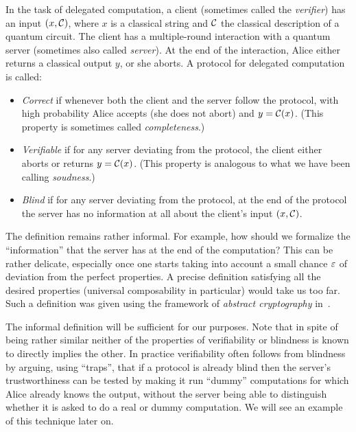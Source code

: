 \begin{definition}
In the task of delegated computation, a client (sometimes called the \emph{verifier}) has an input $(x,\mathcal{C})$, where $x$ is a classical string and $\mathcal{C}$ the classical description of a quantum circuit. The client has a multiple-round interaction with a quantum server (sometimes also called \emph{server}). At the end of the interaction, Alice either returns a classical output $y$, or she aborts. A protocol for delegated computation is called:
\begin{itemize}
\item \emph{Correct} if whenever both the client and the server follow the protocol, with high probability Alice accepts (she does not abort) and $y=\mathcal{C}(x)$. (This property is sometimes called \emph{completeness}.) 
\item \emph{Verifiable} if for any server deviating from the protocol, the client either aborts or returns $y=\mathcal{C}(x)$.  (This property is analogous to what we have been calling \emph{soudness}.) 
\item \emph{Blind} if for any server deviating from the protocol, at the end of the protocol the server has no information at all about the client's input $(x,\mathcal{C})$. 
\end{itemize}
\end{definition}

The definition remains rather informal. For example, how should we formalize the ``information'' that the server has at the end of the computation? This can be rather delicate, especially once one starts taking into account a small chance $\varepsilon$ of deviation from the perfect properties. A precise definition satisfying all the desired properties (universal composability in particular) would take us too far. Such a definition was given using the framework of \emph{abstract cryptography} in~\cite{dunjko2014composable}. 

The informal definition will be sufficient for our purposes. Note that in spite of being rather similar neither of the properties of verifiability or blindness is known to directly implies the other. In practice verifiability often follows from blindness by arguing, using ``traps'', that if a protocol is already blind then the server's trustworthiness can be tested by making it run ``dummy'' computations for which Alice already knows the output, without the server being able to distinguish whether it is asked to do a real or dummy computation. We will see an example of this technique later on. 

